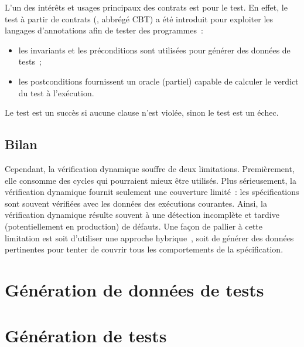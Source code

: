 L'un des intérêts et usages principaux des contrats est pour le test. En effet,
le {\strong test à partir de contrats} (,
abbrégé CBT) a été introduit pour exploiter les langages d'annotations afin de
tester des programmes~:

\begin{itemize}

\item les invariants et les préconditions sont utilisées pour générer des
données de tests~;

\item les postconditions fournissent un oracle (partiel) capable de calculer le
verdict du test à l'exécution.

\end{itemize}

Le test est un {\strong succès} si aucune clause n'est violée, sinon le test est
un {\strong échec}.




\subsection{Bilan}

Cependant, la vérification dynamique souffre de deux limitations. Premièrement,
elle consomme des cycles qui pourraient mieux être utilisés. Plus sérieusement,
la vérification dynamique fournit seulement une couverture limité~: les
spécifications sont souvent vérifiées avec les données des exécutions courantes.
Ainsi, la vérification dynamique résulte souvent à une détection incomplète et
tardive (potentiellement en production) de défauts. Une façon de pallier à cette
limitation est soit d'utiliser une approche hybrique~, soit de
générer des données pertinentes pour tenter de couvrir tous les comportements de
la spécification.

\section{Génération de données de tests}

\section{Génération de tests}

